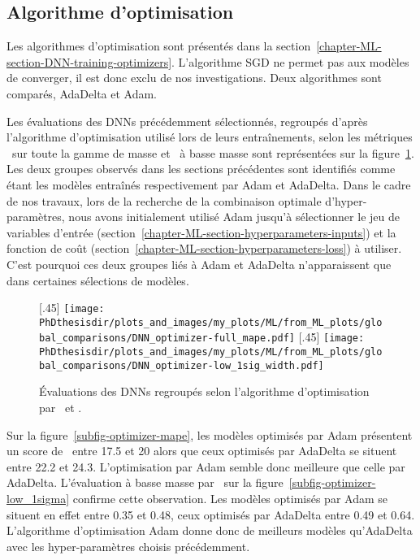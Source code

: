 \subsection{Algorithme d'optimisation}\label{chapter-ML-section-hyperparameters-opti}
Les algorithmes d'optimisation sont présentés dans la section~\ref{chapter-ML-section-DNN-training-optimizers}.
L'algorithme SGD ne permet pas aux modèles de converger, il est donc exclu de nos investigations.
Deux algorithmes sont comparés, AdaDelta et Adam.
\par
Les évaluations des DNNs précédemment sélectionnés,
regroupés d'après l'algorithme d'optimisation utilisé lors de leurs entraînements,
selon les métriques
\LossMAPE\ sur toute la gamme de masse et \OneSigmaWidth\ à basse masse
sont représentées sur la figure~\ref{fig-optimizer}.
Les deux groupes observés dans les sections précédentes sont identifiés comme étant les modèles entraînés respectivement par Adam et AdaDelta.
Dans le cadre de nos travaux, lors de la recherche de la combinaison optimale d'hyper-paramètres,
nous avons initialement utilisé Adam jusqu'à sélectionner
le jeu de variables d'entrée (section~\ref{chapter-ML-section-hyperparameters-inputs})
et
la fonction de coût (section~\ref{chapter-ML-section-hyperparameters-loss}) à utiliser.
C'est pourquoi ces deux groupes liés à Adam et AdaDelta n'apparaissent que dans certaines sélections de modèles.
\begin{figure}[h]
\centering

\subcaptionbox{\label{subfig-optimizer-mape}}[.45\textwidth]
{\texttt{[image: \\PhDthesisdir/plots\_and\_images/my\_plots/ML/from\_ML\_plots/global\_comparisons/DNN\_optimizer-full\_mape.pdf]}\vspace{-\baselineskip}}
\hfill
\subcaptionbox{\label{subfig-optimizer-low_1sigma}}[.45\textwidth]
{\texttt{[image: \\PhDthesisdir/plots\_and\_images/my\_plots/ML/from\_ML\_plots/global\_comparisons/DNN\_optimizer-low\_1sig\_width.pdf]}\vspace{-\baselineskip}}

\caption[Évaluations des DNNs regroupés selon l'algorithme d'optimisation.]{Évaluations des DNNs regroupés selon l'algorithme d'optimisation par \LossMAPE\ et \OneSigmaWidth.}
\label{fig-optimizer}
\end{figure}
\par
Sur la figure~\ref{subfig-optimizer-mape},
les modèles optimisés par Adam présentent un score de \LossMAPE\
entre \num{17.5} et \num{20}
alors que ceux optimisés par AdaDelta se situent
entre \num{22.2} et \num{24.3}.
L'optimisation par Adam semble donc meilleure que celle par AdaDelta.
L'évaluation à basse masse par \OneSigmaWidth\ sur la figure~\ref{subfig-optimizer-low_1sigma}
confirme cette observation.
Les modèles optimisés par Adam se situent en effet
entre \num{0.35} et \num{0.48},
ceux optimisés par AdaDelta
entre \num{0.49} et \num{0.64}.
L'algorithme d'optimisation Adam donne donc de meilleurs modèles qu'AdaDelta avec les hyper-paramètres choisis précédemment.
